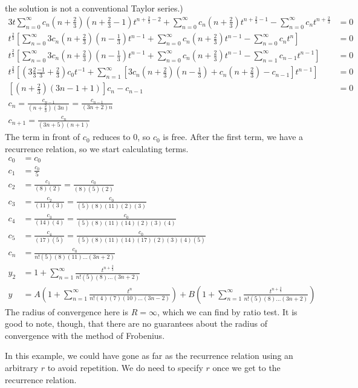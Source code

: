 \documentclass[fleqn,letterpaper]{report}
\begin{document}
\begin{example}
the solution is not a conventional Taylor series.)
\begin{align*}
3t \sum_{n=0}^\infty c_n \left(n + \frac{2}{3} \right) \left(n
+ \frac{2}{3}-1 \right)
t^{n + \frac{2}{3}-2} 
+ \sum_{n=0}^\infty c_n \left(n + \frac{2}{3} \right) t^{n + 
\frac{2}{3}-1} - \sum_{n=0}^\infty c_n t^{n + \frac{2}{3}} & =
0 \\ t^{\frac{2}{3}} \left[ \sum_{n=0}^\infty 3c_n \left(n+
\frac{2}{3} \right) \left(n - \frac{1}{3} \right) t^{n-1} 
+ \sum_{n=0}^\infty c_n \left(n+ \frac{2}{3} \right) t^{n-1} 
- \sum_{n=0}^\infty c_n t^{n} \right] & = 0 \\
t^{\frac{2}{3}} \left[ \sum_{n=0}^\infty 3c_n
\left(n + \frac{2}{3} \right) \left( n - \frac{1}{3}
\right) t^{n -1}
+ \sum_{n=0}^\infty c_n \left(n + \frac{2}{3} \right) t^{n-1}
- \sum_{n=1}^\infty c_{n-1} t^{n-1} \right] & = 0 \\
t^{\frac{2}{3}} \left[ \left(3\frac{2}{3} \frac{-1}{3} +
\frac{2}{3} \right) c_0 t^{-1} + \sum_{n=1}^\infty \left[ 3
c_n \left( n+ \frac{2}{3} \right) \left( n - \frac{1}{3}
\right) + c_n \left( n + \frac{2}{3} \right) - c_{n-1} 
\right] t^{n-1} \right] & = 0 \\
\left[ \left( n + \frac{2}{3} \right) \left( 3n - 1 + 1
\right) \right] c_n - c_{n-1} & = 0 \\
c_n = \frac{c_{n-1}}{ \left( n + \frac{2}{3} \right) (3n)} =
\frac{c_{n-1}}{(3n+2)n} & \\
c_{n+1} = \frac{c_n}{(3n+5)(n+1)} & 
\end{align*}
The term in front of $c_0$ reduces to $0$, so $c_0$ is
free. After the first term, we have a recurrence relation, 
so we start calculating terms.
\begin{align*}
c_0 & = c_0 \\
c_1 & = \frac{c_0}{5} \\
c_2 & = \frac{c_1}{(8)(2)} = \frac{c_0}{(8)(5)(2)} \\
c_3 & = \frac{c_2}{(11)(3)} = \frac{c_0}{(5)(8)(11)(2)(3)} \\
c_4 & = \frac{c_3}{(14)(4)} =
\frac{c_0}{(5)(8)(11)(14)(2)(3)(4)} \\
c_5 & = \frac{c_4}{(17)(5)} =
\frac{c_0}{(5)(8)(11)(14)(17)(2)(3)(4)(5)} \\
c_n & = \frac{c_0}{n! (5)(8)(11) \ldots (3n+2)} \\
y_2 & = 1 + \sum_{n=1}^\infty \frac{t^{n + \frac{2}{3}}}{n! (5)(8)
\ldots (3n+2)} \\
y & = A \left( 1 + \sum_{n=1}^\infty \frac{t^n}{n! (4)(7)(10) \ldots
(3n-2)} \right) 
+ B \left( 1 + \sum_{n=1}^\infty \frac{t^{n + \frac{2}{3}}}{n!
(5)(8) \ldots (3n+2)} \right) 
\end{align*}
The radius of convergence here is $R = \infty$, which we can
find by ratio test. It is good to note, though, that there
are no guarantees about the radius of convergence with the
method of Frobenius.

In this example, we could have gone as far as the recurrence
relation using an arbitrary $r$ to avoid repetition. We do
need to specify $r$ once we get to the recurrence relation.
\end{example}
\end{document}
